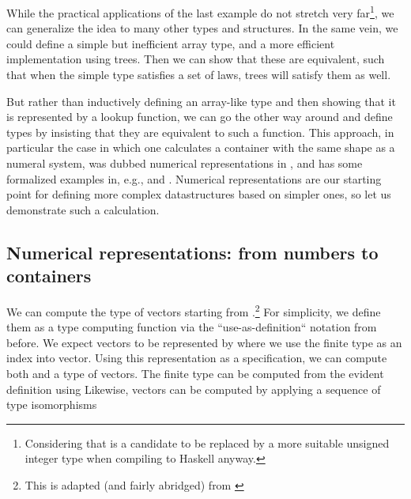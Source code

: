 While the practical applications of the last example do not stretch very far\footnote{Considering that  is a candidate to be replaced by a more suitable unsigned integer type when compiling to Haskell anyway.}, we can generalize the idea to many other types and structures. In the same vein, we could define a simple but inefficient array type, and a more efficient implementation using trees. Then we can show that these are equivalent, such that when the simple type satisfies a set of laws, trees will satisfy them as well. %

But rather than inductively defining an array-like type and then showing that it is represented by a lookup function, we can go the other way around and define types by insisting that they are equivalent to such a function. This approach, in particular the case in which one calculates a container with the same shape as a numeral system, was dubbed numerical representations in \cite{purelyfunctional}, and has some formalized examples in, e.g., \cite{calcdata} and \cite{progorn}. Numerical representations are our starting point for defining more complex datastructures based on simpler ones, so let us demonstrate such a calculation. 

\subsection{Numerical representations: from numbers to containers}\label{ssec:numrep}
We can compute the type of vectors starting from \bN{}.\footnote{This is adapted (and fairly abridged) from \cite{calcdata}} For simplicity, we define them as a type computing function via the ``use-as-definition`` notation from before. We expect vectors to be represented by 
where we use the finite type  as an index into vector. Using this representation as a specification, we can compute both  and a type of vectors. The finite type can be computed from the evident definition
using
Likewise, vectors can be computed by applying a sequence of type isomorphisms

